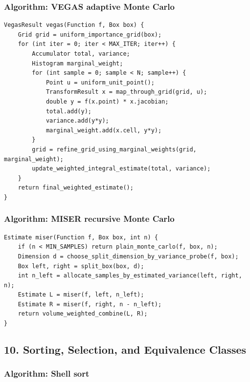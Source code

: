 \documentclass[11pt]{article}
\begin{document}
\subsubsection{Algorithm: VEGAS adaptive Monte Carlo}\label{algorithm-vegas-adaptive-monte-carlo}

\begin{verbatim}
VegasResult vegas(Function f, Box box) {
    Grid grid = uniform_importance_grid(box);
    for (int iter = 0; iter < MAX_ITER; iter++) {
        Accumulator total, variance;
        Histogram marginal_weight;
        for (int sample = 0; sample < N; sample++) {
            Point u = uniform_unit_point();
            TransformResult x = map_through_grid(grid, u);
            double y = f(x.point) * x.jacobian;
            total.add(y);
            variance.add(y*y);
            marginal_weight.add(x.cell, y*y);
        }
        grid = refine_grid_using_marginal_weights(grid, marginal_weight);
        update_weighted_integral_estimate(total, variance);
    }
    return final_weighted_estimate();
}
\end{verbatim}

\subsubsection{Algorithm: MISER recursive Monte Carlo}\label{algorithm-miser-recursive-monte-carlo}

\begin{verbatim}
Estimate miser(Function f, Box box, int n) {
    if (n < MIN_SAMPLES) return plain_monte_carlo(f, box, n);
    Dimension d = choose_split_dimension_by_variance_probe(f, box);
    Box left, right = split_box(box, d);
    int n_left = allocate_samples_by_estimated_variance(left, right, n);
    Estimate L = miser(f, left, n_left);
    Estimate R = miser(f, right, n - n_left);
    return volume_weighted_combine(L, R);
}
\end{verbatim}

\subsection{10. Sorting, Selection, and Equivalence Classes}\label{sorting-selection-and-equivalence-classes}

\subsubsection{Algorithm: Shell sort}\label{algorithm-shell-sort}
\end{document}

